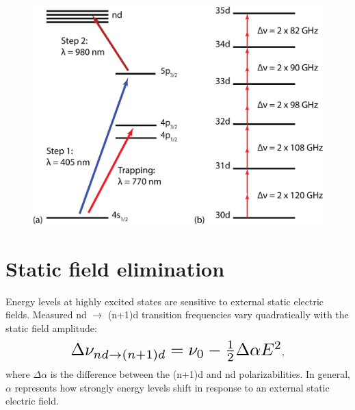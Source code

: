 \documentclass[landscape]{sciposter}
\begin{document}
\begin{multicols}{4}

\begin{figure}
\begin{center}
\includegraphics[scale = 0.95]{excitation.png}
\end{center}
\end{figure}


\section*{\large Static field elimination}
Energy levels at highly excited states are sensitive to external static electric fields. Measured nd $\rightarrow$ (n+1)d transition frequencies vary quadratically with the static field amplitude:
\begin{equation*}
\resizebox{0.65\hsize}{!}{$\Delta \nu_{nd \rightarrow (n+1)d} = \nu_{0} - \frac{1}{2} \Delta \alpha E^2$},
\end{equation*}
where $\Delta \alpha$ is the difference between the (n+1)d and nd polarizabilities. In general, $\alpha$ represents how strongly energy levels shift in response to an external static electric field. 


\end{multicols}
\end{document}

